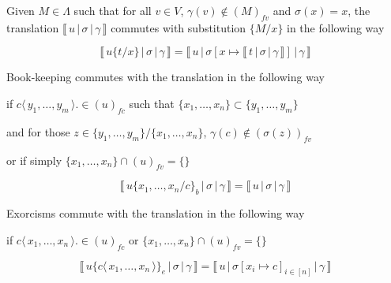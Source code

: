 \documentclass[a4paper,UKenglish,cleveref, autoref]{lipics-v2019}
\newcommand{\fv}[1]{(#1)_{fv}}
\newcommand{\fc}[1]{(#1)_{fc}}
\newcommand{\set}[1]{ \{ #1 \} }
\newcommand{\fake}[3]{#1 \langle \, #2 \, \rangle . #3}
\newcommand{\fakedist}[2]{#1 \langle \, #2 \, \rangle}
\newcommand{\sub}[3]{#1 \{ #2 / #3 \}}
\newcommand{\psub}[3]{#1 \{ #2 / #3 \}_{b}}
\newcommand{\exor}[3]{#1 \{ \fakedist{#2}{#3} \}_{e}}
\newcommand{\readbackwmap}[3]{\llbracket \, #1 \, \vert \, #2 \, \vert \, #3  \, \rrbracket }
\begin{document}
\begin{proposition}
\label{prop:suboutcomm}
Given $M \in \Lambda$ such that for all $v \in V$, $\gamma(v) \not\in \fv{M}$  and $\sigma(x) = x$, the translation $\readbackwmap{u}{\sigma}{\gamma}$ commutes with substitution $\sub{}{M}{x}$ in the following way 

$$\readbackwmap{u \sub{}{t}{x}}{\sigma}{\gamma} = \readbackwmap{u}{\sigma[x \mapsto \readbackwmap{t}{\sigma}{\gamma}]}{\gamma}$$

%
\end{proposition}

%

\begin{proposition}
\label{prop:bkcomm}
Book-keeping commutes with the translation in the following way

if $\fake{c}{y_{1}, \dots, y_{m}} \in \fc{u}$ such that $\set{x_{1}, \dots, x_{n}} \subset \set{y_{1}, \dots, y_{m}}$

and for those $z \in \set{y_{1}, \dots, y_{m}} / \set{x_{1}, \dots, x_{n}}$, $\gamma(c) \not\in \fv{\sigma(z)}$

or if simply $\set{x_{1}, \dots, x_{n}} \cap \fv{u} = \set{}$

$$\readbackwmap{u \psub{}{x_{1}, \dots, x_{n}}{c}}{\sigma}{\gamma} = \readbackwmap{u}{\sigma}{\gamma}$$

\end{proposition}

\begin{proposition}
\label{prop:exorcomm}
Exorcisms commute with the translation in the following way

if $\fake{c}{x_{1}, \dots, x_{n}} \in \fc{u}$ or $\set{x_{1}, \dots, x_{n}} \cap \fv{u} = \set{}$

$$\readbackwmap{u \exor{}{c}{x_{1}, \dots, x_{n}}}{\sigma}{\gamma} = \readbackwmap{u}{\sigma[x_{i} \mapsto c]_{i \in [n]}}{\gamma}$$
\end{proposition}
\end{document}
